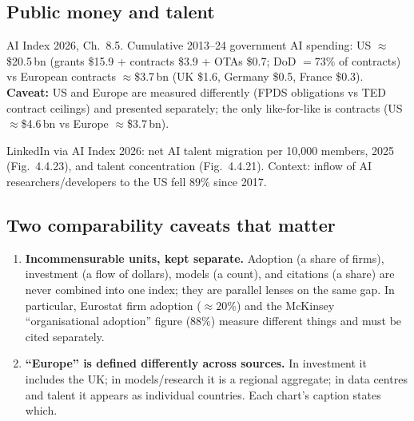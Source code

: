 \documentclass[11pt,a4paper]{article}
\begin{document}
\subsection{Public money and talent}
\begin{description}[leftmargin=1.4em,style=nextline]
\item[Public investment] AI Index 2026, Ch.~8.5. Cumulative 2013--24 government
  AI spending: US $\approx$\$20.5\,bn (grants \$15.9 + contracts \$3.9 + OTAs
  \$0.7; DoD $=73\%$ of contracts) vs European contracts $\approx$\$3.7\,bn
  (UK \$1.6, Germany \$0.5, France \$0.3). \textbf{Caveat:} US and Europe are
  measured differently (FPDS obligations vs TED contract ceilings) and presented
  separately; the only like-for-like is contracts (US $\approx$\$4.6\,bn vs
  Europe $\approx$\$3.7\,bn).
\item[Talent] LinkedIn via AI Index 2026: net AI talent migration per 10{,}000
  members, 2025 (Fig.~4.4.23), and talent concentration (Fig.~4.4.21). Context:
  inflow of AI researchers/developers to the US fell $89\%$ since 2017.
\end{description}

\subsection{Two comparability caveats that matter}\label{sec:caveats}
\begin{enumerate}[label=(\roman*)]
  \item \textbf{Incommensurable units, kept separate.} Adoption (a share of
  firms), investment (a flow of dollars), models (a count), and citations (a
  share) are never combined into one index; they are parallel lenses on the same
  gap. In particular, Eurostat firm adoption ($\approx 20\%$) and the McKinsey
  ``organisational adoption'' figure ($88\%$) measure different things and must
  be cited separately.
  \item \textbf{``Europe'' is defined differently across sources.} In investment
  it includes the UK; in models/research it is a regional aggregate; in data
  centres and talent it appears as individual countries. Each chart's caption
  states which.
\end{enumerate}
\end{document}
